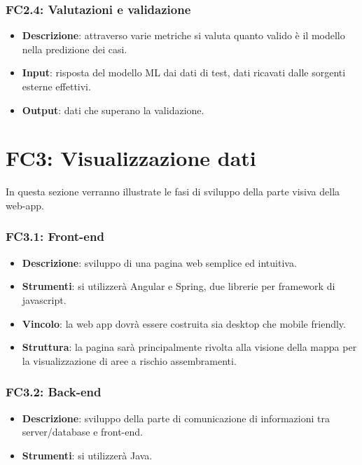 \subsubsection{FC2.4: Valutazioni e validazione}

\begin{itemize}
	\item \textbf{Descrizione}: attraverso varie metriche si valuta quanto valido è il modello nella predizione dei casi.
	\item \textbf{Input}: risposta del modello ML dai dati di test, dati ricavati dalle sorgenti esterne effettivi.
	\item \textbf{Output}: dati che superano la validazione.
\end{itemize}

\section{FC3: Visualizzazione dati}
In questa sezione verranno illustrate le fasi di sviluppo della parte visiva della web-app.

\subsubsection{FC3.1: Front-end}

\begin{itemize}
	\item \textbf{Descrizione}: sviluppo di una pagina web semplice ed intuitiva.
	\item \textbf{Strumenti}: si utilizzerà Angular e Spring, due librerie per framework di javascript.
	\item \textbf{Vincolo}: la web app dovrà essere costruita sia desktop che mobile friendly. 
	\item \textbf{Struttura}: la pagina sarà principalmente rivolta alla visione della mappa per la visualizzazione di aree a rischio assembramenti.
\end{itemize}

\subsubsection{FC3.2: Back-end}

\begin{itemize}
	\item \textbf{Descrizione}: sviluppo della parte di comunicazione di informazioni tra server/database e front-end.
	\item \textbf{Strumenti}: si utilizzerà Java.
\end{itemize}


